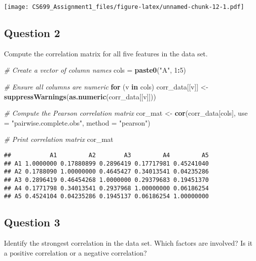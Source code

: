 \documentclass[
]{article}
\newenvironment{Shaded}{\begin{snugshade}}{\end{snugshade}}
\newcommand{\AttributeTok}[1]{\textcolor[rgb]{0.13,0.29,0.53}{#1}}
\newcommand{\CommentTok}[1]{\textcolor[rgb]{0.56,0.35,0.01}{\textit{#1}}}
\newcommand{\ControlFlowTok}[1]{\textcolor[rgb]{0.13,0.29,0.53}{\textbf{#1}}}
\newcommand{\DecValTok}[1]{\textcolor[rgb]{0.00,0.00,0.81}{#1}}
\newcommand{\FunctionTok}[1]{\textcolor[rgb]{0.13,0.29,0.53}{\textbf{#1}}}
\newcommand{\NormalTok}[1]{#1}
\newcommand{\OtherTok}[1]{\textcolor[rgb]{0.56,0.35,0.01}{#1}}
\newcommand{\SpecialCharTok}[1]{\textcolor[rgb]{0.81,0.36,0.00}{\textbf{#1}}}
\newcommand{\StringTok}[1]{\textcolor[rgb]{0.31,0.60,0.02}{#1}}
\begin{document}
\texttt{[image: CS699\_Assignment1\_files/figure-latex/unnamed-chunk-12-1.pdf]}

\subsection{Question 2}\label{question-2-1}

Compute the correlation matrix for all five features in the data set.

\begin{Shaded}
\begin{Highlighting}[]
\CommentTok{\# Create a vector of column names}
\NormalTok{cols }\OtherTok{=} \FunctionTok{paste0}\NormalTok{(}\StringTok{"A"}\NormalTok{, }\DecValTok{1}\SpecialCharTok{:}\DecValTok{5}\NormalTok{)}

\CommentTok{\# Ensure all columns are numeric}
\ControlFlowTok{for}\NormalTok{ (v }\ControlFlowTok{in}\NormalTok{ cols) corr\_data[[v]] }\OtherTok{\textless{}{-}} \FunctionTok{suppressWarnings}\NormalTok{(}\FunctionTok{as.numeric}\NormalTok{(corr\_data[[v]]))}

\CommentTok{\# Compute the Pearson correlation matrix}
\NormalTok{cor\_mat }\OtherTok{\textless{}{-}} \FunctionTok{cor}\NormalTok{(corr\_data[cols], }\AttributeTok{use =} \StringTok{"pairwise.complete.obs"}\NormalTok{, }\AttributeTok{method =} \StringTok{"pearson"}\NormalTok{)}

\CommentTok{\# Print correlation matrix}
\NormalTok{cor\_mat}
\end{Highlighting}
\end{Shaded}

\begin{verbatim}
##           A1         A2        A3         A4         A5
## A1 1.0000000 0.17880899 0.2896419 0.17717981 0.45241040
## A2 0.1788090 1.00000000 0.4645427 0.34013541 0.04235286
## A3 0.2896419 0.46454268 1.0000000 0.29379683 0.19451370
## A4 0.1771798 0.34013541 0.2937968 1.00000000 0.06186254
## A5 0.4524104 0.04235286 0.1945137 0.06186254 1.00000000
\end{verbatim}

\subsection{Question 3}\label{question-3-1}

Identify the strongest correlation in the data set. Which factors are
involved? Is it a positive correlation or a negative correlation?
\end{document}
